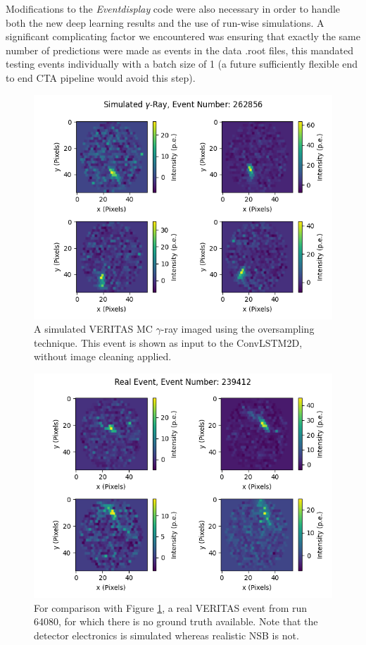 Modifications to the \textit{Eventdisplay} code were also necessary in order to handle both the new deep learning results and the use of run-wise simulations. A significant complicating factor we encountered was ensuring that exactly the same number of predictions were made as events in the data .root files, this mandated testing events individually with a batch size of 1 (a future sufficiently flexible end to end CTA pipeline would avoid this step). 
\begin{figure}[] 
        \centering \includegraphics[width=0.8\columnwidth]{figures/sim_272_oversampling.png}

        \caption{
                \label{fig:sim} A simulated VERITAS MC $\gamma$-ray imaged using the oversampling technique. This event is shown as input to the ConvLSTM2D, without image cleaning applied.
        }
\end{figure}
\begin{figure}[] 
        \centering \includegraphics[width=0.8\columnwidth]{figures/realevent_303_oversampling.png}

        \caption{
                \label{fig:real} For comparison with Figure \ref{fig:sim}, a real VERITAS event from run 64080, for which there is no ground truth available. Note that the detector electronics is simulated whereas realistic NSB is not.
        }
\end{figure}
